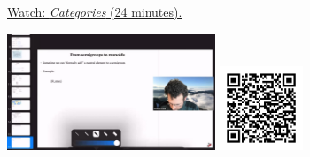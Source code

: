 
\begin{minipage}{10cm}
    \href{https://act4e-spring21.netlify.app/videos/spring2021-semicats-cats:categories.html}{Watch: \emph{Categories} (24 minutes).}
        
    \href{https://act4e-spring21.netlify.app/videos/spring2021-semicats-cats:categories.html}{\includegraphics[height=3.5cm]{spring2021-semicats-cats:categories/thumbnails.jpg}}
    \href{https://act4e-spring21.netlify.app/videos/spring2021-semicats-cats:categories.html}{\includegraphics[height=2.5cm]{spring2021-semicats-cats:categories/qrcode.png}}
\end{minipage}
